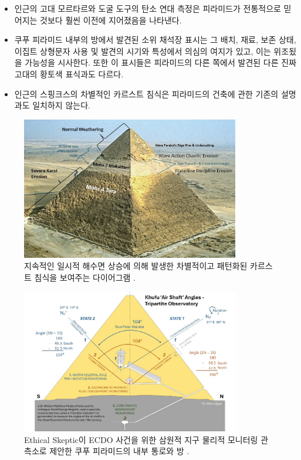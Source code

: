 \documentclass[10pt,twocolumn,letterpaper]{article}
\begin{document}
\begin{flushleft}
\begin{itemize}
    \item 인근의  고대 모르타르와 도굴 도구의 탄소 연대 측정은 피라미드가 전통적으로 믿어지는 것보다 훨씬 이전에 지어졌음을 나타낸다.
    \item 쿠푸 피라미드 내부의 방에서 발견된 소위 채석장 표시는 그 배치, 재료, 보존 상태, 이집트 상형문자 사용 및 발견의 시기와 특성에서 의심의 여지가 있고, 이는 위조됬을 가능성을 시사한다. 또한 이 표시들은 피라미드의 다른 
    쪽에서 발견된 다른 진짜 고대의 황토색 표식과도 다르다.
    \item 인근의 스핑크스의 차별적인 카르스트 침식은 피라미드의  건축에 관한  기존의 설명과도 일치하지 않는다.
\end{itemize}
\end{flushleft}

\begin{figure}[t]
\begin{center}
\includegraphics[width=0.85\textwidth]{khafre.jpg}
\end{center}
   \caption{지속적인 일시적 해수면 상승에 의해 발생한 차별적이고 패턴화된 카르스트 침식을 보여주는 다이어그램 \cite{27}.}
\label{fig:4}
\end{figure}

\begin{figure}[t]
\begin{center}
\includegraphics[width=0.85\textwidth]{shafts.jpg}
\end{center}
   \caption{Ethical Skeptic이 ECDO 사건을 위한 삼원적 지구 물리적 모니터링 관측소로 제안한 쿠푸 피라미드의 내부 통로와 방 \cite{28}.}
\label{fig:5}
\end{figure}
\end{document}
